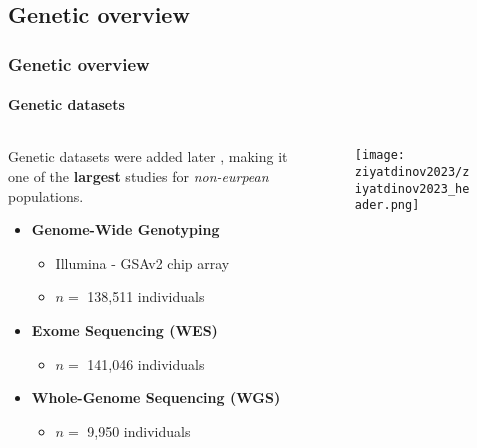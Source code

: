 \subsection{Genetic overview}
\begin{frame}
    \frametitle{Genetic overview}
    \framesubtitle{Genetic datasets}

    \begin{columns}
    \begin{column}{0.5\textwidth}

        Genetic datasets were added later \parencite{ziyatdinov2023}, making it one of the \textbf{\color{complement-1} largest} studies for \textit{non-eurpean} populations.

        \begin{itemize}[itemsep=2pt,topsep=10pt]
            \item<1-> \textbf{\color{primary-color} Genome-Wide Genotyping}
            \begin{itemize}[label=$\bullet$,noitemsep,topsep=0pt]
                \item Illumina - GSAv2 chip array
                \item $n =$ 138,511 individuals
            \end{itemize}
            \item<2-> \textbf{\color{primary-color} Exome Sequencing (WES)}
            \begin{itemize}[label=$\bullet$,noitemsep,topsep=0pt]
                \item $n =$ 141,046 individuals
            \end{itemize}
            \item<3-> \textbf{\color{primary-color} Whole-Genome Sequencing (WGS)}
            \begin{itemize}[label=$\bullet$,noitemsep,topsep=0pt]
                \item $n =$ 9,950 individuals
            \end{itemize}
        \end{itemize}
    \end{column}
    
    \begin{column}{0.5\textwidth}
        \begin{figure}[htpb]
            \centering
            \texttt{[image: ziyatdinov2023/ziyatdinov2023\_header.png]}
        \end{figure}
    \end{column}
    \end{columns}
\end{frame}


